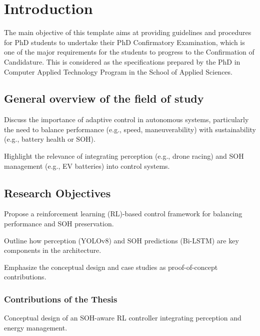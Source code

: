 
\chapter{Introduction}\label{ch:1}
\minitoc

The main objective of this template aims at providing guidelines and procedures for \gls{PhD} students to undertake their PhD Confirmatory Examination, which is one of the major requirements for the students to progress to the Confirmation of Candidature. This is considered as the specifications prepared by the PhD in Computer Applied Technology Program in the School of Applied Sciences.

\newpage

\section{General overview of the field of study}

Discuss the importance of adaptive control in autonomous systems, particularly the need to balance performance (e.g., speed, maneuverability) with sustainability (e.g., battery health or SOH).

Highlight the relevance of integrating perception (e.g., drone racing) and SOH management (e.g., EV batteries) into control systems.



\section{Research Objectives}

Propose a reinforcement learning (RL)-based control framework for balancing performance and SOH preservation.

Outline how perception (YOLOv8) and SOH predictions (Bi-LSTM) are key components in the architecture.

Emphasize the conceptual design and case studies as proof-of-concept contributions.


\subsection{Contributions of the Thesis}

Conceptual design of an SOH-aware RL controller integrating perception and energy management.


